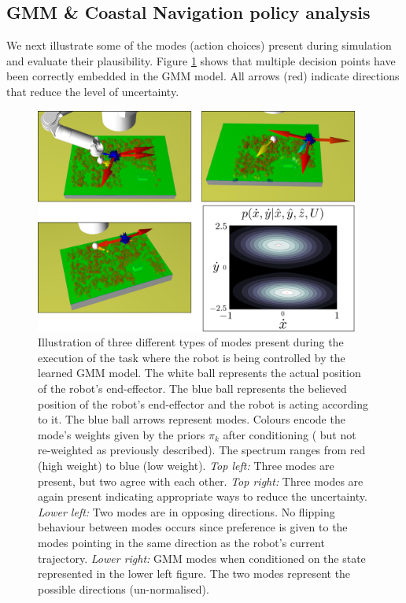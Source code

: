 \FloatBarrier
\subsection{GMM \& Coastal Navigation policy analysis}\label{sub:policy_analysis}

We next illustrate some of the modes (action choices) present during simulation and evaluate their 
plausibility. Figure \ref{fig:modes} shows that multiple decision points have been correctly embedded in the GMM model. All
arrows (red) indicate directions that reduce the level of uncertainty. 

\begin{figure}
    \centering
    \includegraphics[width=0.95\textwidth]{./ch3-Search/Figures/Figure9}
    \caption{Illustration of three different types of modes present during the
    execution of the task where the robot is being controlled by the learned GMM model.
    The white ball represents the actual position of the robot's end-effector. The blue ball represents the
    believed position of the robot's end-effector and the robot is acting according to it. 
    The blue ball arrows represent modes. Colours encode the mode's weights given by the priors $\pi_{k}$ after conditioning ( but not re-weighted as
    previously described). The spectrum ranges from red (high weight) to blue (low weight). \textit{Top left:} Three modes are present, but two agree with each other.   
    \textit{Top right:} Three modes are again present indicating appropriate ways to reduce the uncertainty. \textit{Lower left:} Two modes are in opposing directions. 
    No flipping behaviour between modes occurs since preference is given to the modes pointing in the same direction as the robot's current trajectory. \textit{Lower right:} GMM modes when conditioned on the state represented in the lower left figure.
    The two modes represent the possible directions (un-normalised).}
   \label{fig:modes}
\end{figure}

